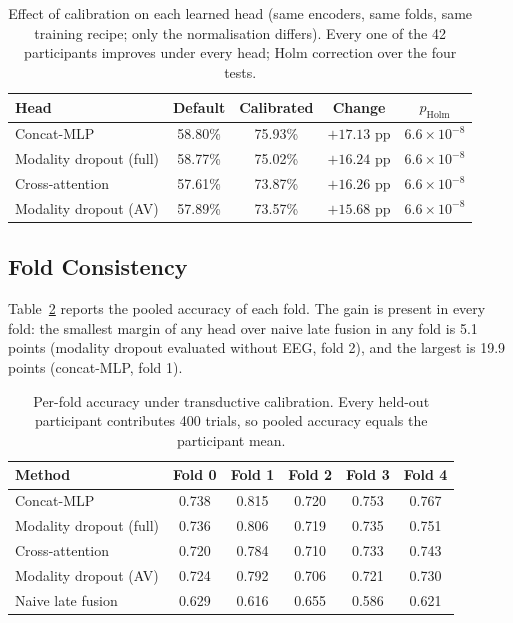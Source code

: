 \begin{table}[htbp]
\centering
\small
\caption{Effect of calibration on each learned head (same encoders, same folds, same
training recipe; only the normalisation differs). Every one of the 42 participants
improves under every head; Holm correction over the four tests.}
\label{tab:cal_effect}
\begin{tabular}{lcccc}
\hline
\textbf{Head} & \textbf{Default} & \textbf{Calibrated} & \textbf{Change} & \textbf{$p_{\mathrm{Holm}}$} \\
\hline
Concat-MLP              & 58.80\% & 75.93\% & $+17.13$ pp & $6.6\times10^{-8}$ \\
Modality dropout (full) & 58.77\% & 75.02\% & $+16.24$ pp & $6.6\times10^{-8}$ \\
Cross-attention         & 57.61\% & 73.87\% & $+16.26$ pp & $6.6\times10^{-8}$ \\
Modality dropout (AV)   & 57.89\% & 73.57\% & $+15.68$ pp & $6.6\times10^{-8}$ \\
\hline
\end{tabular}
\end{table}

\subsection{Fold Consistency}

Table~\ref{tab:cal_perfold} reports the pooled accuracy of each fold. The gain is
present in every fold: the smallest margin of any head over naive late fusion in any
fold is 5.1 points (modality dropout evaluated without EEG, fold 2), and the largest is 19.9 points
(concat-MLP, fold 1).

\begin{table}[htbp]
\centering
\small
\caption{Per-fold accuracy under transductive calibration. Every held-out
participant contributes 400 trials, so pooled accuracy equals the participant mean.}
\label{tab:cal_perfold}
\begin{tabular}{lccccc}
\hline
\textbf{Method} & \textbf{Fold 0} & \textbf{Fold 1} & \textbf{Fold 2} & \textbf{Fold 3} & \textbf{Fold 4} \\
\hline
Concat-MLP              & 0.738 & 0.815 & 0.720 & 0.753 & 0.767 \\
Modality dropout (full) & 0.736 & 0.806 & 0.719 & 0.735 & 0.751 \\
Cross-attention         & 0.720 & 0.784 & 0.710 & 0.733 & 0.743 \\
Modality dropout (AV)   & 0.724 & 0.792 & 0.706 & 0.721 & 0.730 \\
Naive late fusion       & 0.629 & 0.616 & 0.655 & 0.586 & 0.621 \\
\hline
\end{tabular}
\end{table}


